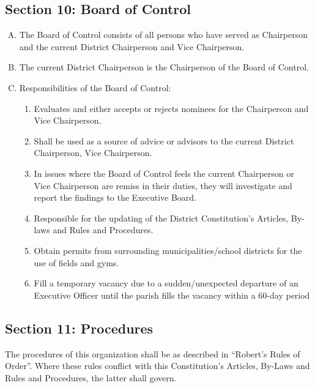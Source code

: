 \documentclass[letteraper,10pt,oneside,draft]{memoir}
\begin{document}
\subsection{Section 10: Board of Control}
\label{ssec:const-4-10}
\begin{enumerate}[A.]
    \item The Board of Control consists of all persons who have served as Chairperson and the current District 
    Chairperson and Vice Chairperson.
    \item The current District Chairperson is the Chairperson of the Board of Control.
    \item Responsibilities of the Board of Control:
    \begin{enumerate}[1.]
        \item Evaluates and either accepts or rejects nominees for the Chairperson and Vice Chairperson.
        \item Shall be used as a source of advice or advisors to the current District Chairperson, Vice Chairperson. 
        \item In issues where the Board of Control feels the current Chairperson or Vice Chairperson are remiss in their duties, they will investigate and report the findings to the Executive Board.
        \item Responsible for the updating of the District Constitution’s Articles, By-laws and Rules and Procedures.
        \item Obtain permits from surrounding municipalities/school districts for the use of fields and gyms.
        \item Fill a temporary vacancy due to a sudden/unexpected departure of an Executive Officer until the parish fills the vacancy within a 60-day period
    \end{enumerate}
\end{enumerate}

\subsection{Section 11: Procedures}
\label{ssec:const-4-11}
The procedures of this organization shall be as described in ``Robert's Rules of Order''.  Where these rules conflict with this Constitution’s Articles, By-Laws and Rules and Procedures, the latter shall govern.
    
\end{document}
